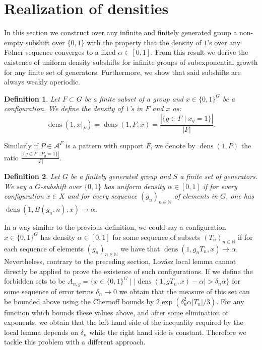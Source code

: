 \documentclass[letterpaper]{article}
\theoremstyle{plain}
\newtheorem{definition}{Definition}[section]
\def\NN{\mathbb{N}}
\def\ag{\mathcal{A}}
\def\dens{\operatorname{dens}}
\newcommand{\cor}[2][]{#2}
\begin{document}
	\section{Realization of densities}
	\label{section.realization_densities}
	
	In this section we construct over any infinite and finitely generated group a non-empty subshift over $\{0,1\}$ with the property that the density of $1$'s over any F\o lner sequence converges to a fixed $\alpha \in [0,1]$. From this result we derive the existence of uniform density subshifts for infinite groups of subexponential growth for any finite set of generators. Furthermore, we show that said subshifts are always weakly aperiodic.
	
	\begin{definition}
		Let $F \subset G$ be a finite subset of a group and $x \in \{0,1\}^G$ be a configuration. We define the \emph{density of $1$'s in $F$ and $x$} as: $$\dens(1,x|_F) = \dens(1,F,x) = \frac{|\{g \in F \mid x_g = 1 \}|}{|F|}.$$
	\end{definition}
	
	Similarly if $P\in\ag^F$ is a pattern with support $F$, we denote by $\dens(1,P)$ the ratio $\frac{|\{g \in F \mid P_g = 1 \}|}{|F|}$.
	
	\begin{definition}
		Let $G$ be a finitely generated group and $S$ a finite set of generators. We say a $G$-subshift over $\{0,1\}$ has uniform density $\alpha \in [0,1]$ if for every configuration $x \in X$ and for every sequence $(g_n)_{n\in\NN}$ of elements in $G$, one has $\dens(1,B(g_n,n),x)\to \alpha$.
	\end{definition}
	
	In a way similar to the previous definition, we could say a configuration $x \in \{0,1\}^G$ has density $\alpha \in [0,1]$ for some sequence of subsets $(T_n)_{n \in \NN}$ if for each sequence of elements $(g_n)_{n \in \NN}$ we have that $\dens(1,g_nT_n,x) \to \alpha$. Nevertheless, contrary to the preceding section, Lov\'asz local lemma cannot directly be applied to prove the existence of \cor{such} configurations. If we define the forbidden sets to be $A_{n,g} = \{x \in \{0,1\}^G \mid |\dens(1,gT_n,x)- \alpha | > \delta_n\alpha \}$ for some sequence of error terms $\delta_n \to 0$ we obtain that the measure of this set can be bounded \cor[by]{} above using the Chernoff bounds by $2\exp(\delta_n^2\alpha|T_n|/3)$. For any function which bounds these values \cor[by]{} above, and after some elimination of exponents, we obtain that the left hand side of the inequality required by the local lemma depends on $\delta_n$ while the right hand side is constant. Therefore we tackle this problem with a different 
approach.
	
\end{document}
